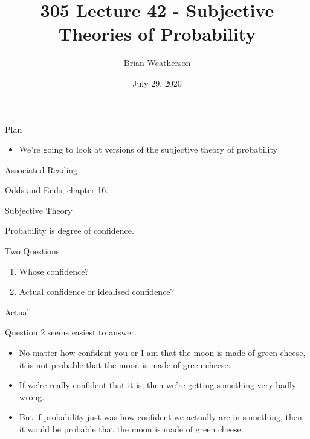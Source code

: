 \documentclass[
  ignorenonframetext,
]{beamer}
\title{305 Lecture 42 - Subjective Theories of Probability}
\author{Brian Weatherson}
\date{July 29, 2020}
\providecommand{\tightlist}{%
  \setlength{\itemsep}{0pt}\setlength{\parskip}{0pt}}
\renewcommand{\,}{\text{, }}
\begin{document}
\frame{\titlepage}

\begin{frame}{Plan}
\protect\hypertarget{plan}{}

\begin{itemize}
\tightlist
\item
  We're going to look at versions of the subjective theory of
  probability
\end{itemize}

\end{frame}

\begin{frame}{Associated Reading}
\protect\hypertarget{associated-reading}{}

Odds and Ends, chapter 16.

\end{frame}

\begin{frame}{Subjective Theory}
\protect\hypertarget{subjective-theory}{}

Probability is degree of confidence.

\end{frame}

\begin{frame}{Two Questions}
\protect\hypertarget{two-questions}{}

\begin{enumerate}
\tightlist
\item
  Whose confidence? \pause
\item
  Actual confidence or idealised confidence?
\end{enumerate}

\end{frame}

\begin{frame}{Actual}
\protect\hypertarget{actual}{}

Question 2 seems easiest to answer.

\begin{itemize}
\tightlist
\item
  No matter how confident you or I am that the moon is made of green
  cheese, it is not probable that the moon is made of green cheese.
\item
  If we're really confident that it is, then we're getting something
  very badly wrong.
\item
  But if probability just was how confident we actually are in
  something, then it would be probable that the moon is made of green
  cheese.
\end{itemize}

\end{frame}
\end{document}
